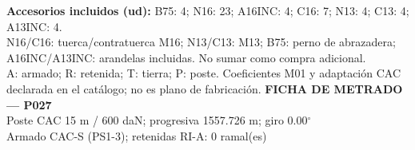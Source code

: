 \begingroup\scriptsize
\textbf{Accesorios incluidos (ud):} B75: 4; N16: 23; A16INC: 4; C16: 7; N13: 4; C13: 4; A13INC: 4.\\
N16/C16: tuerca/contratuerca M16; N13/C13: M13; B75: perno de abrazadera; A16INC/A13INC: arandelas incluidas. No sumar como compra adicional.\\
A: armado; R: retenida; T: tierra; P: poste. Coeficientes M01 y adaptación CAC declarada en el catálogo; no es plano de fabricación.
\endgroup\endgroup
\clearpage{}
\begingroup\small\setlength{\parskip}{3pt}\renewcommand{\arraystretch}{1.05}
\textbf{\large FICHA DE METRADO — P027}\\[4pt]
Poste CAC 15 m / 600 daN; progresiva 1557.726 m; giro 0.00\ensuremath{^\circ}\\
Armado CAC-S (PS1-3); retenidas RI-A: 0 ramal(es)\\
\begingroup\scriptsize
